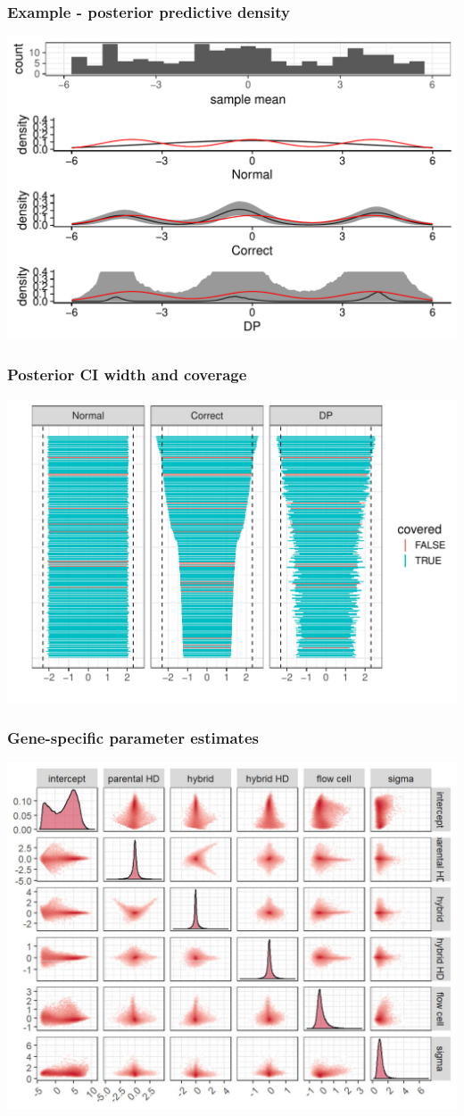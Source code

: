\documentclass[handout]{beamer}
\begin{document}
\begin{frame}%
  \frametitle{Example - posterior predictive density}
  \centering
  \includegraphics[height=.92\textheight]{predictive_12_5}
\end{frame}

\begin{frame}%
  \frametitle{Posterior CI width and coverage}
  {
    \centering
    \includegraphics[height=.95\textheight]{cis_12_5}
  }
\end{frame}

\begin{frame}%
  \frametitle{Gene-specific parameter estimates}
  {
    \centering
    \includegraphics[width=.8\textwidth]{pairs1} \\
  }
\end{frame}
\end{document}
